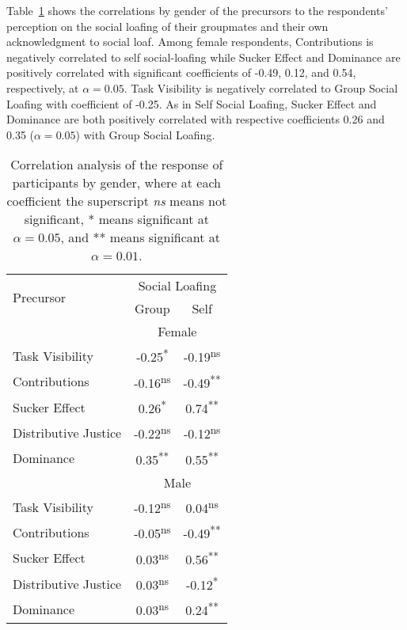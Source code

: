 \documentclass[a4paper,a4paper,BCOR12mm,12pt,abstracton,pointednumbers,tablecaptionabove,footinclude,halfparskip,normalheadings,]{scrartcl}
\begin{document}
Table~\ref{tab:cor-gender} shows the correlations by gender of the precursors to the respondents' perception on the social loafing of their groupmates and their own acknowledgment to social loaf. Among female respondents, Contributions is negatively correlated to self social-loafing while Sucker Effect and Dominance are positively correlated with significant coefficients of -0.49, 0.12, and 0.54, respectively, at $\alpha=0.05$. Task Visibility is negatively correlated to Group Social Loafing with coefficient of -0.25. As in Self Social Loafing, Sucker Effect and Dominance are both positively correlated with respective coefficients 0.26 and 0.35 ($\alpha=0.05$) with Group Social Loafing.

\begin{table}[hbt]
\caption{Correlation analysis of the response of participants by gender, where at each coefficient the superscript {\em ns} means not significant, * means significant at $\alpha=0.05$, and ** means significant at $\alpha=0.01$.}\label{tab:cor-gender}
\centering\begin{tabular}{lcc}
\hline\hline
\multirow{2}{*}{Precursor} & \multicolumn{2}{c}{Social Loafing}\\
\cline{2-3}
                           & Group & Self\\
\hline
                & \multicolumn{2}{c}{Female}\\
\cline{2-3}
Task Visibility & -0.25\textsuperscript{*}  & -0.19\textsuperscript{ns} \\
Contributions   & -0.16\textsuperscript{ns} & -0.49\textsuperscript{**} \\
Sucker Effect   &  0.26\textsuperscript{*}  &  0.74\textsuperscript{**} \\
Distributive Justice & -0.22\textsuperscript{ns} & -0.12\textsuperscript{ns}\\
Dominance       &  0.35\textsuperscript{**} &  0.55\textsuperscript{**}\\
\hline
                & \multicolumn{2}{c}{Male}\\
\cline{2-3}
Task Visibility & -0.12\textsuperscript{ns} &  0.04\textsuperscript{ns} \\
Contributions   & -0.05\textsuperscript{ns} & -0.49\textsuperscript{**} \\
Sucker Effect   &  0.03\textsuperscript{ns} &  0.56\textsuperscript{**} \\
Distributive Justice & 0.03\textsuperscript{ns} & -0.12\textsuperscript{*}\\
Dominance       &  0.03\textsuperscript{ns} &  0.24\textsuperscript{**}\\
\hline\hline
\end{tabular}
\end{table}
\end{document}
